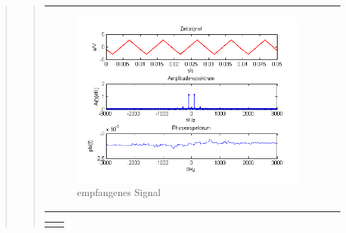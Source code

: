 \begin{quote}
\begin{quote}
\begin{center}
\begin{tabular}{ll}
            \begin{minipage}{0.67\textwidth}
                \begin{figure}[H]
                    \label{fig:DemodreieckmT2}
                    \includegraphics[scale=0.7]{Bilder/Demo_Dre_2k_100Hz_mo_mitTiefpass}
                    \caption{empfangenes Signal}
                \end{figure}
        
            \end{minipage}
        
        \end{tabular}
        \end{center}
        
        \begin{center}
        \begin{tabular}{ll}
        
        \hspace{-5cm}
            \begin{minipage}{0.67\textwidth}
                

\end{minipage}
\end{tabular}
\end{center}
\end{quote}
\end{quote}
